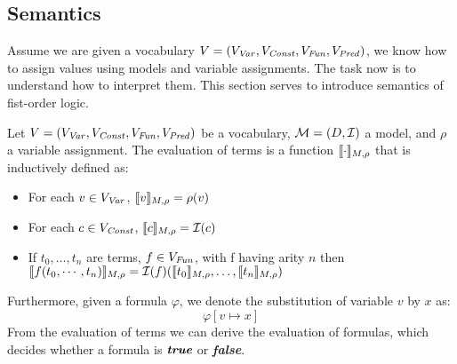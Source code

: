 \subsection{Semantics}
Assume we are given a vocabulary $V = (V_{\mathit{Var}}, V_{\mathit{Const}}, V_{\mathit{Fun}}, V_{\mathit{Pred}})$, we know how to assign values using models and variable assignments. The task now is to understand how to interpret them. This section serves to introduce semantics of fist-order logic.
\begin{mydef}
	Let $V = (V_{\mathit{Var}}, V_{\mathit{Const}}, V_{\mathit{Fun}}, V_{\mathit{Pred}})$ be a vocabulary, $\mathcal{M} = (D, \mathcal{I})$ a model, and $\rho$ a variable assignment. The evaluation of terms is a function $\llbracket \cdot \rrbracket_{M, \rho}$ that is inductively defined as:
	\begin{itemize}
		\item For each $v \in V_{\mathit{Var}}$, $\llbracket v \rrbracket_{M, \rho} = \rho(v)$
		\item For each $c \in V_{\mathit{Const}}$, $\llbracket c \rrbracket_{M, \rho} = \mathcal{I}(c)$
		\item If $t_0, \ldots, t_n$ are terms, $f \in V_{\mathit{Fun}}$, with f having arity $n$ then \\ $\llbracket f(t_0, \cdots, t_n) \rrbracket_{M, \rho} = \mathcal{I}(f)(\llbracket t_0 \rrbracket_{M, \rho}, \ldots, \llbracket t_n \rrbracket_{M, \rho})$
	\end{itemize}
\end{mydef}
Furthermore, given a formula $\varphi$, we denote the substitution of variable $v$ by $x$ as:
\begin{equation*}
	\varphi[v \mapsto x]
\end{equation*}
From the evaluation of terms we can derive the evaluation of formulas, which decides whether a formula is $\textit{\textbf{true}}$ or \textit{\textbf{false}}.

